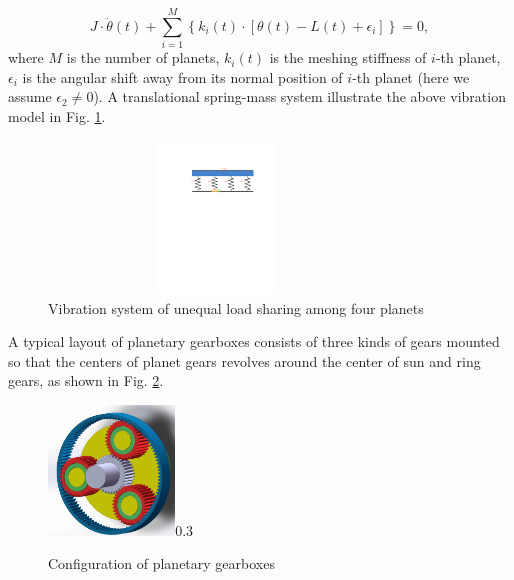 \documentclass[a4paper,fleqn]{cas-sc}
\begin{document}
\begin{enumerate}[1.]
\begin{equation}
        J \cdot \ddot{\theta}(t) + \sum^{M}_{i=1} \left\{ k_i(t) \cdot \left[\theta(t)-L(t)+\epsilon_i \right] \right\} = 0,
    \end{equation}
    where \(M\) is the number of planets, \(k_i(t)\) is the meshing stiffness of \(i\)-th planet, \(\epsilon_i\) is the angular shift away from its normal position of \(i\)-th planet (here we assume \(\epsilon_2\neq 0\)). A translational spring-mass system illustrate the above vibration model in Fig. \ref{fig:vibration_system_of_spring_mass}.
    \begin{figure}
        \centering
        \includegraphics[scale=0.6,width=0.8\textwidth,height=1.6in]{spring_mass.pdf}
        \caption{Vibration system of unequal load sharing among four planets}
        \label{fig:vibration_system_of_spring_mass}
    \end{figure}
\end{enumerate}
A typical layout of planetary gearboxes consists of three kinds of gears mounted so that the centers of planet gears revolves around the center of sun and ring gears, as shown in Fig. \ref{fig:planetary_gearbox_layout}.
\begin{figure}[pos=htbp]
    \centering
    \begin{annotate}{\includegraphics[width=0.3\textwidth]{Planetary_Gearbox.PNG}}{0.3}
    \end{annotate}
    \caption{Configuration of planetary gearboxes}
    \label{fig:planetary_gearbox_layout}
\end{figure}
\subsection{}
\end{document}
